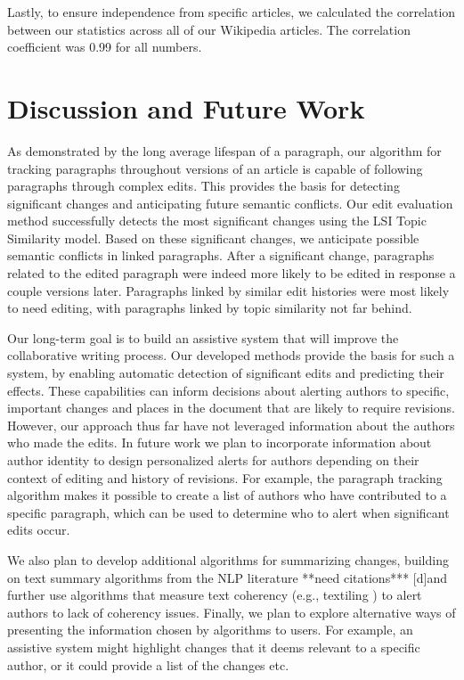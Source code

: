 Lastly, to ensure independence from specific articles, we calculated the
correlation between our statistics across all of our Wikipedia articles.
The correlation coefficient was 0.99 for all numbers.

\section{Discussion and Future Work}\label{discussion-and-future-work}

As demonstrated by the long average lifespan of a paragraph, our
algorithm for tracking paragraphs throughout versions of an article is
capable of following paragraphs through complex edits. This provides the
basis for detecting significant changes and anticipating future semantic
conflicts. Our edit evaluation method successfully detects the most
significant changes using the LSI Topic Similarity model. Based on these
significant changes, we anticipate possible semantic conflicts in linked
paragraphs. After a significant change, paragraphs related to the edited
paragraph were indeed more likely to be edited in response a couple
versions later. Paragraphs linked by similar edit histories were most
likely to need editing, with paragraphs linked by topic similarity not
far behind.

Our long-term goal is to build an assistive system that will improve the
collaborative writing process. Our developed methods provide the basis
for such a system, by enabling automatic detection of significant edits
and predicting their effects. These capabilities can inform decisions
about alerting authors to specific, important changes and places in the
document that are likely to require revisions. However, our approach
thus far have not leveraged information about the authors who made the
edits. In future work we plan to incorporate information about author
identity to design personalized alerts for authors depending on their
context of editing and history of revisions. For example, the paragraph
tracking algorithm makes it possible to create a list of authors who
have contributed to a specific paragraph, which can be used to determine
who to alert when significant edits occur.

We also plan to develop additional algorithms for summarizing changes,
building on text summary algorithms from the NLP literature **need
citations*** {[}d{]}and further use algorithms that measure text
coherency (e.g., textiling \cite{hearst1994multi}) to alert authors to
lack of coherency issues. Finally, we plan to explore alternative ways
of presenting the information chosen by algorithms to users. For
example, an assistive system might highlight changes that it deems
relevant to a specific author, or it could provide a list of the changes
etc.
